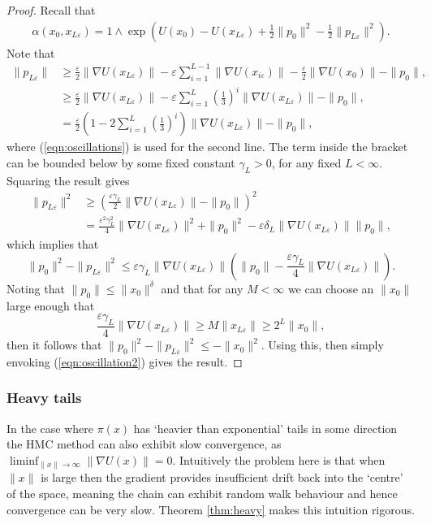\documentclass[bj,numbers,noshowframe]{imsart}
\newcommand{\e}{\varepsilon}
\theoremstyle{definition}
\theoremstyle{plain}
\theoremstyle{definition}
\begin{document}
\begin{proof}
Recall that
\begin{align*}
\alpha(x_0,x_{L\e}) = 1 \wedge \exp\left( U(x_0) - U(x_{L\e}) + \frac{1}{2}\|p_0\|^2 - \frac{1}{2}\|p_{L\e}\|^2 \right).
\end{align*}
Note that
\begin{align*}
\|p_{L\e}\| &\geq \frac{\e}{2}\|\nabla U(x_{L\e})\| - \e\sum_{i=1}^{L-1} \|\nabla U(x_{i\e})\| - \frac{\e}{2}\|\nabla U(x_0)\| - \|p_0\|, \\
&\geq \frac{\e}{2}\|\nabla U(x_{L\e})\| - \e\sum_{i=1}^{L} \left( \frac{1}{3} \right)^i \|\nabla U(x_{L\e})\| - \|p_0\|, \\
&= \frac{\e}{2}\left( 1- 2\sum_{i=1}^L \left(\frac{1}{3}\right)^i \right) \|\nabla U(x_{L\e})\| - \|p_0\|,
\end{align*}
where (\ref{eqn:oscillations}) is used for the second line.  The term inside the bracket can be bounded below by some fixed constant $\gamma_L >0$, for any fixed $L<\infty$.  Squaring the result gives
\begin{align*}
\|p_{L\e}\|^2 &\geq \left( \frac{\e\gamma_L}{2}\|\nabla U(x_{L\e})\| - \|p_0\|\right)^2 \\ 
&= \frac{\e^2\gamma_L^2}{4}\|\nabla U(x_{L\e})\|^2 + \|p_0\|^2 - \e\delta_L\|\nabla U(x_{L\e})\|\|p_0\|,
\end{align*}
which implies that
\[
\|p_0\|^2 - \|p_{L\e}\|^2 \leq \e\gamma_L\|\nabla U(x_{L\e})\| \left( \|p_0\| - \frac{\e\gamma_L}{4}\|\nabla U(x_{L\e})\| \right).
\]
Noting that $\|p_0\|\leq \|x_0\|^\delta$ and that for any $M<\infty$ we can choose an $\|x_0\|$ large enough that
\[
\frac{\e\gamma_L}{4}\|\nabla U(x_{L\e})\| \geq M\|x_{L\e}\|\geq 2^L\|x_0\|,
\]
then it follows that $\|p_0\|^2 - \|p_{L\e}\|^2 \leq -\|x_0\|^2$.  Using this, then simply envoking (\ref{eqn:oscillation2}) gives the result.
\end{proof}


\subsubsection{Heavy tails}

In the case where $\pi(x)$ has `heavier than exponential' tails in some direction the HMC method can also exhibit slow convergence, as $\liminf_{\|x\| \to \infty}\|\nabla U(x)\| = 0$.  Intuitively the problem here is that when $\|x\|$ is large then the gradient provides insufficient drift back into the `centre' of the space, meaning the chain can exhibit random walk behaviour and hence convergence can be very slow.  Theorem \ref{thm:heavy} makes this intuition rigorous.
\end{document}
